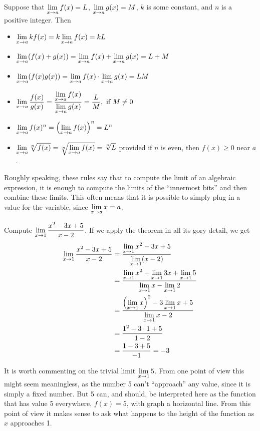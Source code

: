 \begin{mainTheorem}
Suppose that $\displaystyle \lim_{x\to a}f(x)=L$, $\displaystyle \lim_{x\to a}g(x)=M$, $k$
is some constant, and $n$ is a positive integer. Then
\begin{itemize}
\item $\displaystyle\lim_{x\to a} kf(x) = k\lim_{x\to a}f(x)=kL$ 
\item $\displaystyle\lim_{x\to a} (f(x)+g(x)) = \lim_{x\to a}f(x)+\lim_{x\to a}g(x)=L+M$  
\item $\displaystyle\lim_{x\to a} (f(x)g(x)) = \lim_{x\to a}f(x)\cdot\lim_{x\to a}g(x)=LM$ 
\item $\displaystyle\lim_{x\to a} \frac{f(x)}{g(x)} = \frac{\displaystyle\lim_{x\to a}f(x)}{\displaystyle\lim_{x\to
    a}g(x)}=\frac{L}{M},\text{ if $M\ne0$}$
\item $\displaystyle\lim_{x\to a} f(x)^n = \left(\displaystyle\lim_{x\to a}f(x)\right)^n=L^n$
\item $\displaystyle\lim_{x\to a} \sqrt[n]{f(x)} = \sqrt[n]{\displaystyle\lim_{x\to
    a}f(x)}=\sqrt[n]{L}$ provided if $n$ is even, then $f(x)\ge 0$
  near $a$.
\end{itemize}
\label{thm:limit laws}
\end{mainTheorem}

Roughly speaking, these rules say that to compute the limit of an
algebraic expression, it is enough to compute the limits of the
``innermost bits'' and then combine these limits. This often means
that it is possible to simply plug in a value for the variable, since
$\displaystyle \lim_{x\to a} x =a$.


\begin{example}
Compute $\displaystyle
\lim_{x\to 1}{x^2-3x+5\over x-2}$. If we apply the theorem
in all its gory detail, we get
\begin{align*}
\lim_{x\to 1}{x^2-3x+5\over x-2}&=
\dfrac{\displaystyle\lim_{x\to 1}x^2-3x+5}{\displaystyle\lim_{x\to1}(x-2)} \\
&=\dfrac{\displaystyle\lim_{x\to 1}x^2-\displaystyle\lim_{x\to1}3x+\lim_{x\to1}5}{\displaystyle\lim_{x\to1}x-\displaystyle\lim_{x\to1}2} \\
&=\dfrac{\left(\displaystyle\lim_{x\to 1}x\right)^2-3\displaystyle\lim_{x\to1}x+5}{\displaystyle\lim_{x\to1}x-2} \\
&=\dfrac{1^2-3\cdot1+5}{1-2} \\
&=\dfrac{1-3+5}{-1} = -3 \\
\end{align*}
\end{example}

It is worth commenting on the trivial limit $\displaystyle \lim_{x\to1}5$. From one
point of view this might seem meaningless, as the number 5 can't
``approach'' any value, since it is simply a fixed number. But 5 can,
and should, be interpreted here as the function that has value 5
everywhere, $f(x)=5$, with graph a horizontal line. From this point of
view it makes sense to ask what happens to the height of the function
as $x$ approaches 1.

